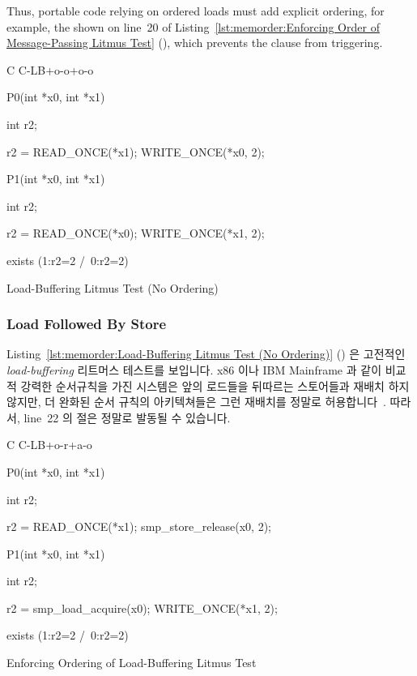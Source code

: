 Thus, portable code relying on ordered loads must
add explicit ordering, for example, the  shown on
line~20 of
Listing~\ref{lst:memorder:Enforcing Order of Message-Passing Litmus Test}
(), which prevents
the  clause from triggering.
\fi

\begin{listing}[tbp]
{ \scriptsize
\begin{verbbox}[\LstLineNo]
C C-LB+o-o+o-o
{
}

P0(int *x0, int *x1)
{
  int r2;

  r2 = READ_ONCE(*x1);
  WRITE_ONCE(*x0, 2);
}


P1(int *x0, int *x1)
{
  int r2;

  r2 = READ_ONCE(*x0);
  WRITE_ONCE(*x1, 2);
}

exists (1:r2=2 /\ 0:r2=2)
\end{verbbox}
}
\centering
\theverbbox
\caption{Load-Buffering Litmus Test (No Ordering)}
\label{lst:memorder:Load-Buffering Litmus Test (No Ordering)}
\end{listing}

\subsubsection{Load Followed By Store}
\label{sec:memorder:Load Followed By Store}

Listing~\ref{lst:memorder:Load-Buffering Litmus Test (No Ordering)}
()
은 고전적인 \emph{load-buffering} 리트머스 테스트를 보입니다.
x86 이나 IBM Mainframe 과 같이 비교적 강력한 순서규칙을 가진 시스템은 앞의
로드들을 뒤따르는 스토어들과 재배치 하지 않지만, 더 완화된 순서 규칙의
아키텍쳐들은 그런 재배치를 정말로 허용합니다~\cite{JadeAlglave2011ppcmem}.
따라서, line~22 의  절은 정말로 발동될 수 있습니다.

\begin{listing}[tbp]
{ \scriptsize
\begin{verbbox}[\LstLineNo]
C C-LB+o-r+a-o
{
}

P0(int *x0, int *x1)
{
  int r2;

  r2 = READ_ONCE(*x1);
  smp_store_release(x0, 2);
}


P1(int *x0, int *x1)
{
  int r2;

  r2 = smp_load_acquire(x0);
  WRITE_ONCE(*x1, 2);
}

exists (1:r2=2 /\ 0:r2=2)
\end{verbbox}
}
\centering
\theverbbox
\caption{Enforcing Ordering of Load-Buffering Litmus Test}
\label{lst:memorder:Enforcing Ordering of Load-Buffering Litmus Test}
\end{listing}

